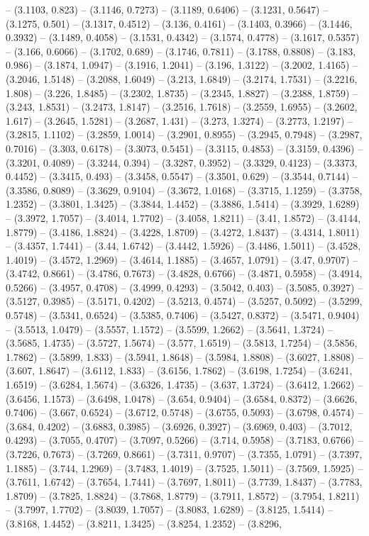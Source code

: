 -- (3.1103, 0.823) -- (3.1146, 0.7273) -- (3.1189, 0.6406) -- (3.1231, 0.5647) -- (3.1275, 0.501) -- (3.1317, 0.4512) -- (3.136, 0.4161) -- (3.1403, 0.3966) -- (3.1446, 0.3932) -- (3.1489, 0.4058) -- (3.1531, 0.4342) -- (3.1574, 0.4778) -- (3.1617, 0.5357) -- (3.166, 0.6066) -- (3.1702, 0.689) -- (3.1746, 0.7811) -- (3.1788, 0.8808) -- (3.183, 0.986) -- (3.1874, 1.0947) -- (3.1916, 1.2041) -- (3.196, 1.3122) -- (3.2002, 1.4165) -- (3.2046, 1.5148) -- (3.2088, 1.6049) -- (3.213, 1.6849) -- (3.2174, 1.7531) -- (3.2216, 1.808) -- (3.226, 1.8485) -- (3.2302, 1.8735) -- (3.2345, 1.8827) -- (3.2388, 1.8759) -- (3.243, 1.8531) -- (3.2473, 1.8147) -- (3.2516, 1.7618) -- (3.2559, 1.6955) -- (3.2602, 1.617) -- (3.2645, 1.5281) -- (3.2687, 1.431) -- (3.273, 1.3274) -- (3.2773, 1.2197) -- (3.2815, 1.1102) -- (3.2859, 1.0014) -- (3.2901, 0.8955) -- (3.2945, 0.7948) -- (3.2987, 0.7016) -- (3.303, 0.6178) -- (3.3073, 0.5451) -- (3.3115, 0.4853) -- (3.3159, 0.4396) -- (3.3201, 0.4089) -- (3.3244, 0.394) -- (3.3287, 0.3952) -- (3.3329, 0.4123) -- (3.3373, 0.4452) -- (3.3415, 0.493) -- (3.3458, 0.5547) -- (3.3501, 0.629) -- (3.3544, 0.7144) -- (3.3586, 0.8089) -- (3.3629, 0.9104) -- (3.3672, 1.0168) -- (3.3715, 1.1259) -- (3.3758, 1.2352) -- (3.3801, 1.3425) -- (3.3844, 1.4452) -- (3.3886, 1.5414) -- (3.3929, 1.6289) -- (3.3972, 1.7057) -- (3.4014, 1.7702) -- (3.4058, 1.8211) -- (3.41, 1.8572) -- (3.4144, 1.8779) -- (3.4186, 1.8824) -- (3.4228, 1.8709) -- (3.4272, 1.8437) -- (3.4314, 1.8011) -- (3.4357, 1.7441) -- (3.44, 1.6742) -- (3.4442, 1.5926) -- (3.4486, 1.5011) -- (3.4528, 1.4019) -- (3.4572, 1.2969) -- (3.4614, 1.1885) -- (3.4657, 1.0791) -- (3.47, 0.9707) -- (3.4742, 0.8661) -- (3.4786, 0.7673) -- (3.4828, 0.6766) -- (3.4871, 0.5958) -- (3.4914, 0.5266) -- (3.4957, 0.4708) -- (3.4999, 0.4293) -- (3.5042, 0.403) -- (3.5085, 0.3927) -- (3.5127, 0.3985) -- (3.5171, 0.4202) -- (3.5213, 0.4574) -- (3.5257, 0.5092) -- (3.5299, 0.5748) -- (3.5341, 0.6524) -- (3.5385, 0.7406) -- (3.5427, 0.8372) -- (3.5471, 0.9404) -- (3.5513, 1.0479) -- (3.5557, 1.1572) -- (3.5599, 1.2662) -- (3.5641, 1.3724) -- (3.5685, 1.4735) -- (3.5727, 1.5674) -- (3.577, 1.6519) -- (3.5813, 1.7254) -- (3.5856, 1.7862) -- (3.5899, 1.833) -- (3.5941, 1.8648) -- (3.5984, 1.8808) -- (3.6027, 1.8808) -- (3.607, 1.8647) -- (3.6112, 1.833) -- (3.6156, 1.7862) -- (3.6198, 1.7254) -- (3.6241, 1.6519) -- (3.6284, 1.5674) -- (3.6326, 1.4735) -- (3.637, 1.3724) -- (3.6412, 1.2662) -- (3.6456, 1.1573) -- (3.6498, 1.0478) -- (3.654, 0.9404) -- (3.6584, 0.8372) -- (3.6626, 0.7406) -- (3.667, 0.6524) -- (3.6712, 0.5748) -- (3.6755, 0.5093) -- (3.6798, 0.4574) -- (3.684, 0.4202) -- (3.6883, 0.3985) -- (3.6926, 0.3927) -- (3.6969, 0.403) -- (3.7012, 0.4293) -- (3.7055, 0.4707) -- (3.7097, 0.5266) -- (3.714, 0.5958) -- (3.7183, 0.6766) -- (3.7226, 0.7673) -- (3.7269, 0.8661) -- (3.7311, 0.9707) -- (3.7355, 1.0791) -- (3.7397, 1.1885) -- (3.744, 1.2969) -- (3.7483, 1.4019) -- (3.7525, 1.5011) -- (3.7569, 1.5925) -- (3.7611, 1.6742) -- (3.7654, 1.7441) -- (3.7697, 1.8011) -- (3.7739, 1.8437) -- (3.7783, 1.8709) -- (3.7825, 1.8824) -- (3.7868, 1.8779) -- (3.7911, 1.8572) -- (3.7954, 1.8211) -- (3.7997, 1.7702) -- (3.8039, 1.7057) -- (3.8083, 1.6289) -- (3.8125, 1.5414) -- (3.8168, 1.4452) -- (3.8211, 1.3425) -- (3.8254, 1.2352) -- (3.8296, 